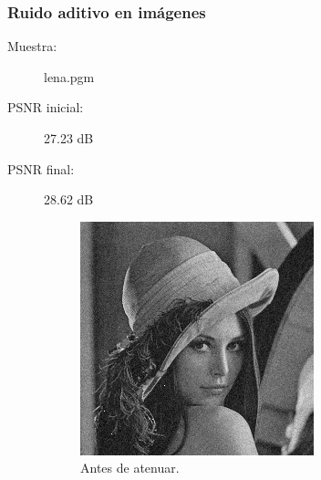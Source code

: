 \documentclass[a4paper,10pt,twoside]{article}
\begin{document}
\subsubsection{Ruido aditivo en imágenes}

\begin{description}
  \item[Muestra:] lena.pgm
  \item[PSNR inicial:] 27.23 dB
  \item[PSNR final:] 28.62 dB
\end{description}

\begin{figure}[H]
  \centering
  \begin{subfigure}[b]{0.45\textwidth}
    \centering
    \includegraphics[width=\textwidth]{graficos/lena_aditivo_muestra.png}    
    \caption{Antes de atenuar.}
  \end{subfigure}
  ~ 
  \begin{subfigure}[b]{0.45\textwidth}
    \centering

\end{subfigure}
\end{figure}
\end{document}

